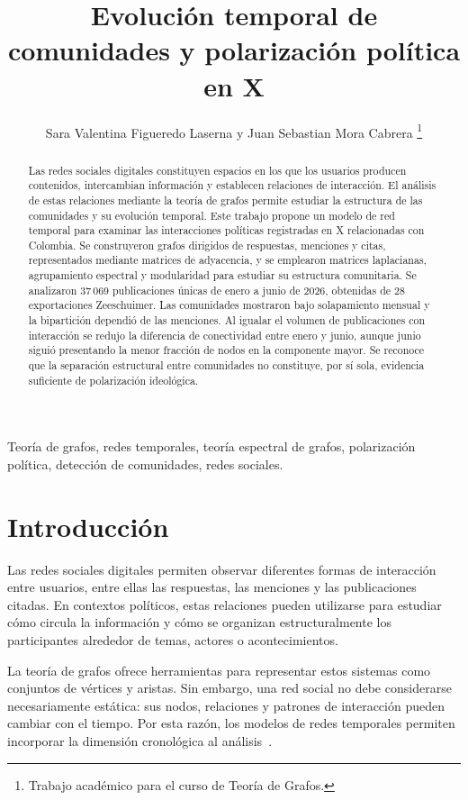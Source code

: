 \documentclass[journal]{IEEEtran}
\title{Evolución temporal de comunidades y polarización política en X}
\author{Sara Valentina Figueredo Laserna y Juan Sebastian Mora Cabrera%
\thanks{Trabajo académico para el curso de Teoría de Grafos.}}
\begin{document}
\maketitle

\begin{abstract}
Las redes sociales digitales constituyen espacios en los que los usuarios producen contenidos, intercambian información y establecen relaciones de interacción. El análisis de estas relaciones mediante la teoría de grafos permite estudiar la estructura de las comunidades y su evolución temporal. Este trabajo propone un modelo de red temporal para examinar las interacciones políticas registradas en X relacionadas con Colombia. Se construyeron grafos dirigidos de respuestas, menciones y citas, representados mediante matrices de adyacencia, y se emplearon matrices laplacianas, agrupamiento espectral y modularidad para estudiar su estructura comunitaria. Se analizaron 37\,069 publicaciones únicas de enero a junio de 2026, obtenidas de 28 exportaciones Zeeschuimer. Las comunidades mostraron bajo solapamiento mensual y la bipartición dependió de las menciones. Al igualar el volumen de publicaciones con interacción se redujo la diferencia de conectividad entre enero y junio, aunque junio siguió presentando la menor fracción de nodos en la componente mayor. Se reconoce que la separación estructural entre comunidades no constituye, por sí sola, evidencia suficiente de polarización ideológica.
\end{abstract}
\begin{IEEEkeywords}
Teoría de grafos, redes temporales, teoría espectral de grafos, polarización política, detección de comunidades, redes sociales.
\end{IEEEkeywords}

\section{Introducción}
Las redes sociales digitales permiten observar diferentes formas de interacción entre usuarios, entre ellas las respuestas, las menciones y las publicaciones citadas. En contextos políticos, estas relaciones pueden utilizarse para estudiar cómo circula la información y cómo se organizan estructuralmente los participantes alrededor de temas, actores o acontecimientos.

La teoría de grafos ofrece herramientas para representar estos sistemas como conjuntos de vértices y aristas. Sin embargo, una red social no debe considerarse necesariamente estática: sus nodos, relaciones y patrones de interacción pueden cambiar con el tiempo. Por esta razón, los modelos de redes temporales permiten incorporar la dimensión cronológica al análisis~\cite{holme}.
\end{document}
